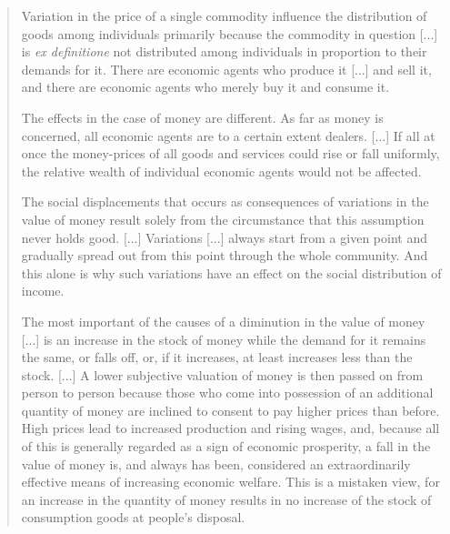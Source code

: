 \documentclass[12pt,a4paper,twoside]{book}
\begin{document}
\begin{quotation}
Variation in the price of a single commodity influence the distribution of goods among individuals primarily because the commodity in question [...] is \textit{ex definitione} not distributed among individuals in proportion to their demands for it. There are economic agents who produce it [...] and sell it, and there are economic agents who merely buy it and consume it.

The effects in the case of money are different. As far as money is concerned, all economic agents are to a certain extent dealers. [...] If all at once the money-prices of all goods and services could rise or fall uniformly, the relative wealth of individual economic agents would not be affected.

The social displacements that occurs as consequences of variations in the value of money result solely from the circumstance that this assumption never holds good. [...] Variations [...] always start from a given point and gradually spread out from this point through the whole community. And this alone is why such variations have an effect on the social distribution of income.

The most important of the causes of a diminution in the value of money [...] is an increase in the stock of money while the demand for it remains the same, or falls off, or, if it increases, at least increases less than the stock. [...] A lower subjective valuation of money is then passed on from person to person because those who come into possession of an additional quantity of money are inclined to consent to pay higher prices than before. High prices lead to increased production and rising wages, and, because all of this is generally regarded as a sign of economic prosperity, a fall in the value of money is, and always has been, considered an extraordinarily effective means of increasing economic welfare. This is a mistaken view, for an increase in the quantity of money results in no increase of the stock of consumption goods at people's disposal.


\end{quotation}
\end{document}
